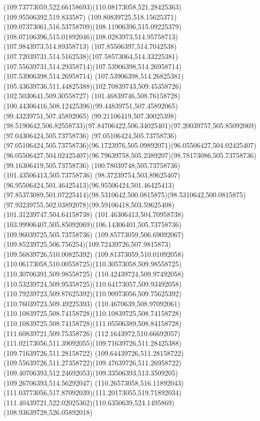 {{\curveto(109.73773059,522.66158693)(110.08173058,521.28425363)(109.95506392,519.833587)
\curveto(109.80839725,518.15625371)(109.07373061,516.53758709)(108.11906396,515.09225379)
\curveto(108.07106396,515.01892046)(108.0283973,514.95758713)(107.9843973,514.89358713)
\curveto(107.85506397,514.7042538)(107.72039731,514.5162538)(107.58573064,514.33225381)
\curveto(107.55639731,514.29358714)(107.53906398,514.26958714)(107.53906398,514.26958714)
\lineto(107.53906398,514.26825381)
\curveto(105.43639736,511.44825388)(102.70839743,509.45358726)(102.5030641,509.30558727)
\curveto(101.46839746,508.76158728)(100.44306416,508.12425396)(99.44839751,507.45892065)
\lineto(99.43239751,507.45892065)
\lineto(99.21106419,507.30025398)
\curveto(98.5190642,506.82558733)(97.84706422,506.34025401)(97.20039757,505.85092069)
\lineto(97.04306424,505.73758736)
\lineto(97.05106424,505.73758736)
\curveto(97.05106424,505.73758736)(96.1723976,505.09892071)(96.05506427,504.02425407)
\curveto(96.05506427,504.02425407)(96.79639758,505.2389207)(98.78173086,505.73758736)
\lineto(99.16306419,505.73758736)
\lineto(100.78039748,505.73758736)
\lineto(101.43506413,505.73758736)
\curveto(98.37239754,503.89625407)(96.95506424,501.46425413)(96.95506424,501.46425413)
\curveto(97.85373089,501.07225414)(98.5310642,500.0815875)(98.5310642,500.0815875)
\curveto(97.93239755,502.03892078)(99.59106418,503.59625408)(101.31239747,504.64158738)
\curveto(101.46306413,504.70958738)(103.99906407,505.85092069)(106.14306401,505.73758736)
\lineto(109.96039725,505.73758736)
\lineto(109.85773059,506.69092067)
\curveto(109.85239725,506.756254)(109.72439726,507.9815873)(109.56839726,510.00825392)
\curveto(109.81373059,510.01092058)(110.06173058,510.00558725)(110.30573058,509.98558725)
\lineto(110.30706391,509.98558725)
\curveto(110.42439724,509.97492058)(110.53239724,509.95358725)(110.64173057,509.93492058)
\curveto(110.79239723,509.87625392)(110.90973056,509.75625392)(110.76039723,509.49225393)
\curveto(110.4670639,508.97092061)(110.10839725,508.74158728)(110.10839725,508.74158728)
\curveto(110.10839725,508.74158728)(111.05506389,508.84158728)(111.60839721,509.75358726)
\curveto(112.1643972,510.66692057)(111.02173056,511.39092055)(109.71639726,511.28425388)
\lineto(109.71639726,511.28158722)
\curveto(109.64439726,511.28158722)(109.55639726,511.27358722)(109.47639726,511.26958722)
\curveto(109.40706393,512.24692053)(109.33506393,513.3509205)(109.26706393,514.56292047)
\curveto(110.26573058,516.11892043)(111.03773056,517.87092039)(111.20173055,519.71892034)
\curveto(111.40439721,522.02025362)(110.6350639,524.1495869)(108.93639728,526.05892018)
}}
